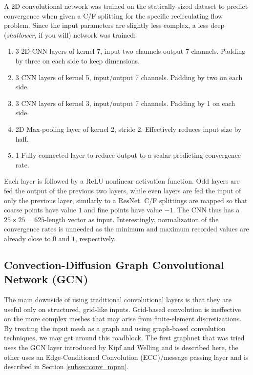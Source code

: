 \documentclass[review]{siamart190516}
\begin{document}
A 2D convolutional network was trained on the statically-sized dataset to predict convergence when given a C/F splitting for the specific recirculating flow problem.  Since the input parameters are slightly less complex, a less deep (\textit{shallower}, if you will) network was trained:
%
\begin{enumerate}
\item 3 2D CNN layers of kernel 7, input two channels output 7 channels.  Padding by three on each side to keep dimensions.
\item 3 CNN layers of kernel 5, input/output 7 channels.  Padding by two on each side.
\item 3 CNN layers of kernel 3, input/output 7 channels.  Padding by 1 on each side.
\item 2D Max-pooling layer of kernel 2, stride 2.  Effectively reduces input size by half.
\item 1 Fully-connected layer to reduce output to a scalar predicting convergence rate.
\end{enumerate}
%
Each layer is followed by a ReLU nonlinear activation function.  Odd layers are fed the output of the previous two layers, while even layers are fed the input of only the previous layer, similarly to a ResNet\cite{huang2018densely,he2015deep}.  C/F splittings are mapped so that coarse points have value $1$ and fine points have value $-1$.  The CNN thus has a $25\times 25=625$-length vector as input.  Interestingly, normalization of the convergence rates is unneeded as the minimum and maximum recorded values are already close to $0$ and $1$, respectively.

\subsection{Convection-Diffusion Graph Convolutional Network (GCN)}\label{subsec:conv_gcn}

The main downside of using traditional convolutional layers is that they are useful only on structured, grid-like inputs.  Grid-based convolution is ineffective on the more complex meshes that may arise from finite-element discretizations.  By treating the input mesh as a graph and using graph-based convolution techniques, we may get around this roadblock.  The first graphnet that was tried uses the GCN layer introduced by Kipf and Welling\cite{gcn} and is described here, the other uses an Edge-Conditioned Convolution (ECC)/message passing layer and is described in Section \ref{subsec:conv_mpnn}.
\end{document}
